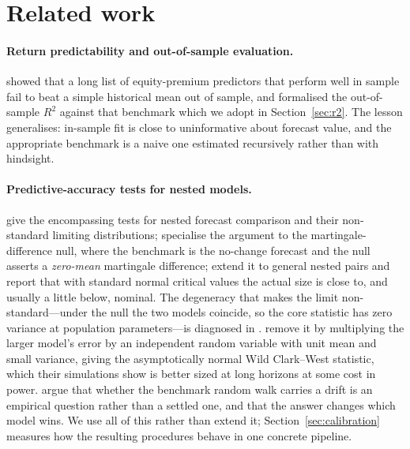 \documentclass{article}
\theoremstyle{plain}
\theoremstyle{definition}
\begin{document}
\section{Related work}

\paragraph{Return predictability and out-of-sample evaluation.}
\citet{welch2008} showed that a long list of equity-premium predictors that
perform well in sample fail to beat a simple historical mean out of sample, and
\citet{campbell2008} formalised the out-of-sample $R^2$ against that benchmark
which we adopt in Section~\ref{sec:r2}. The lesson generalises: in-sample fit is
close to uninformative about forecast value, and the appropriate benchmark is a
naive one estimated recursively rather than with hindsight.

\paragraph{Predictive-accuracy tests for nested models.}
\citet{clark2001} give the encompassing tests for nested forecast comparison and
their non-standard limiting distributions; \citet{clark2006} specialise the
argument to the martingale-difference null, where the benchmark is the no-change
forecast and the null asserts a \emph{zero-mean} martingale difference;
\citet{clark2007} extend it to general nested pairs and report that with standard
normal critical values the actual size is close to, and usually a little below,
nominal. The degeneracy that makes the limit non-standard---under the null the two
models coincide, so the core statistic has zero variance at population
parameters---is diagnosed in \citet{west1996}. \citet{pincheira2021} remove it by
multiplying the larger model's error by an independent random variable with unit
mean and small variance, giving the asymptotically normal Wild Clark--West
statistic, which their simulations show is better sized at long horizons at some
cost in power. \citet{moosa2016} argue that whether the benchmark random walk
carries a drift is an empirical question rather than a settled one, and that the
answer changes which model wins. We use all of this rather than extend it;
Section~\ref{sec:calibration} measures how the resulting procedures behave in one
concrete pipeline.
\end{document}
